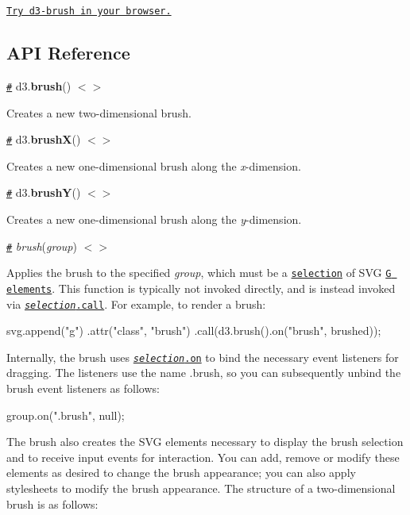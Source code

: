 \href{https://tonicdev.com/npm/d3-brush}{\tt Try d3-\/brush in your browser.}

\subsection*{A\+PI Reference}

\href{#brush}{\tt \#} d3.{\bfseries brush}() \href{https://github.com/d3/d3-brush/blob/master/src/brush.js#L131}{\tt $<$$>$}

Creates a new two-\/dimensional brush.

\href{#brushX}{\tt \#} d3.{\bfseries brushX}() \href{https://github.com/d3/d3-brush/blob/master/src/brush.js#L123}{\tt $<$$>$}

Creates a new one-\/dimensional brush along the {\itshape x}-\/dimension.

\href{#brushY}{\tt \#} d3.{\bfseries brushY}() \href{https://github.com/d3/d3-brush/blob/master/src/brush.js#L127}{\tt $<$$>$}

Creates a new one-\/dimensional brush along the {\itshape y}-\/dimension.

\href{#_brush}{\tt \#} {\itshape brush}({\itshape group}) \href{https://github.com/d3/d3-brush/blob/master/src/brush.js#L142}{\tt $<$$>$}

Applies the brush to the specified {\itshape group}, which must be a \href{https://github.com/d3/d3-selection}{\tt selection} of S\+VG \href{https://www.w3.org/TR/SVG/struct.html#Groups}{\tt G elements}. This function is typically not invoked directly, and is instead invoked via \href{https://github.com/d3/d3-selection#selection_call}{\tt {\itshape selection}.call}. For example, to render a brush\+:


\begin{DoxyCode}
svg.append("g")
    .attr("class", "brush")
    .call(d3.brush().on("brush", brushed));
\end{DoxyCode}


Internally, the brush uses \href{https://github.com/d3/d3-selection#selection_on}{\tt {\itshape selection}.on} to bind the necessary event listeners for dragging. The listeners use the name {\ttfamily .brush}, so you can subsequently unbind the brush event listeners as follows\+:


\begin{DoxyCode}
group.on(".brush", null);
\end{DoxyCode}


The brush also creates the S\+VG elements necessary to display the brush selection and to receive input events for interaction. You can add, remove or modify these elements as desired to change the brush appearance; you can also apply stylesheets to modify the brush appearance. The structure of a two-\/dimensional brush is as follows\+:


